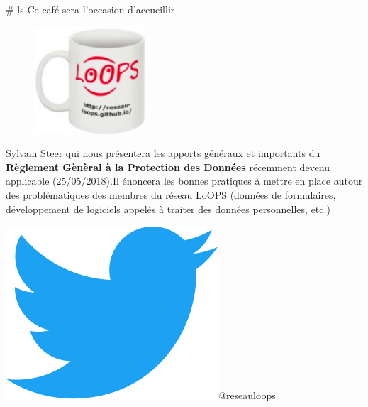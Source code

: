 \documentclass[final]{beamer}
\newlength{\twocolwid}
\begin{document}
\begin{frame}[t]
\begin{columns}[t]
\begin{column}{\twocolwid}
\begin{block}{\# ls}
     Ce caf\'{e} sera l'occasion d'accueillir

\begin{figure}
\centering
\includegraphics[width=0.37\textwidth]{tasse.png}
\end{figure}


Sylvain Steer qui nous pr\'{e}sentera
les apports g\'{e}n\'{e}raux et
importants du
\textbf{R\`{e}glement G\`{e}n\`{e}ral \`{a} la Protection des Donn\'{e}es}
r\'{e}cemment devenu applicable (25/05/2018).Il \'{e}noncera les
bonnes pratiques \`{a} mettre en place autour des probl\'{e}matiques des
membres du r\'{e}seau LoOPS (donn\'{e}es de formulaires, d\'{e}veloppement de
logiciels appel\'{e}s \`{a} traiter des donn\'{e}es personnelles, etc.)
\end{block}











\vspace{2in}

\begin{alertblock}{\includegraphics[width=0.065\linewidth]{Twitter_Bird.png}@reseauloops}
\end{alertblock}


\end{column}
\end{columns}
\end{frame}
\end{document}
